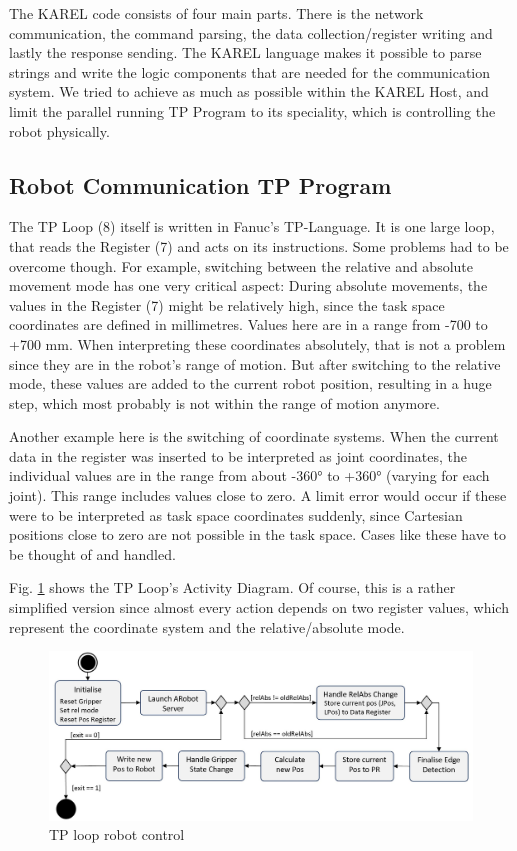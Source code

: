 The KAREL code consists of four main parts. There is the network communication, the command parsing, the data collection/register writing and lastly the response sending. The KAREL language makes it possible to parse strings and write the logic components that are needed for the communication system. We tried to achieve as much as possible within the KAREL Host, and limit the parallel running TP Program to its speciality, which is controlling the robot physically.

\subsection{Robot Communication TP Program}

The TP Loop (8) itself is written in Fanuc's TP-Language. It is one large loop, that reads the Register (7) and acts on its instructions. Some problems had to be overcome though. For example, switching between the relative and absolute movement mode has one very critical aspect: During absolute movements, the values in the Register (7) might be relatively high, since the task space coordinates are defined in millimetres. Values here are in a range from -700 to +700 mm. When interpreting these coordinates absolutely, that is not a problem since they are in the robot's range of motion. But after switching to the relative mode, these values are added to the current robot position, resulting in a huge step, which most probably is not within the range of motion anymore.

Another example here is the switching of coordinate systems. When the current data in the register was inserted to be interpreted as joint coordinates, the individual values are in the range from about -360° to +360° (varying for each joint). This range includes values close to zero. A limit error would occur if these were to be interpreted as task space coordinates suddenly, since Cartesian positions close to zero are not possible in the task space. Cases like these have to be thought of and handled. 

Fig. \ref{Fig:TPLoopFlowChart} shows the TP Loop's Activity Diagram. Of course, this is a rather simplified version since almost every action depends on two register values, which represent the coordinate system and the relative/absolute mode. 

\begin{figure}
	\centering
	\includegraphics[width=0.9\linewidth]{Figures/TPLoopFlowChart.jpg}
	\caption{TP loop robot control}
	\label{Fig:TPLoopFlowChart}
\end{figure}

